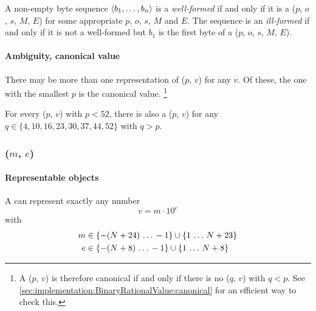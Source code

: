 A non-empty byte sequence $\langle b_1, \ldots, b_n \rangle$ is a \emph{well-formed}
 if and only if
it is a ($p$, $o$, $s$, $M$, $E$) for some
appropriate $p$, $o$, $s$, $M$ and $E$.
The sequence is an \emph{ill-formed}  if and only if it is not a well-formed
 but $b_1$ is the first byte of a
($p$, $o$, $s$, $M$, $E$).

\paragraph{Ambiguity, canonical value}

There may be more than one representation of ($p$, $v$) for any $v$.
Of these, the one with the smallest $p$ is the canonical value.%
\footnote{
    A ($p$, $v$) is therefore canonical if and only if there is
    no ($q$, $v$) with $q < p$.
    See \ref{sec:implementation:BinaryRationalValue:canonical} for an efficient way to check this.
}

For every ($p$, $v$) with $p < 52$, there is also
a ($p$, $v$) for any
$q \in \{4, 10, 16, 23, 30, 37, 44, 52\}$ with $q > p$.


\subsubsection{($m$, $e$)}
\hypertarget{sec:def:DecimalRationalValue}{}

\paragraph{Representable objects}

A  can represent exactly any number
\begin{equation}
    v = m \cdot 10^e
\end{equation}
with
\begin{align*}
    m & \in \{-(N + 24) \,\ldots\, -1\} \cup \{1 \,\ldots\, N + 23\} \\
    e & \in \{-(N + 8) \,\ldots\, -1\} \cup \{1 \,\ldots\, N + 8\}
\end{align*}

